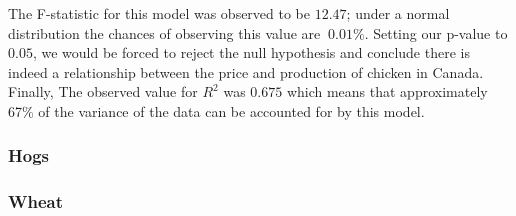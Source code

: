 The F-statistic for this model was observed to be $12.47$; under a normal distribution the chances of observing this value are $~0.01\%$.
Setting our p-value to $0.05$, we would be forced to reject the null hypothesis and conclude there is indeed a relationship between the price and production of chicken in Canada.
Finally, The observed value for $R^2$ was $0.675$ which means that approximately 67\% of the variance of the data can be accounted for by this model.

\subsubsection{Hogs}

\subsubsection{Wheat}



